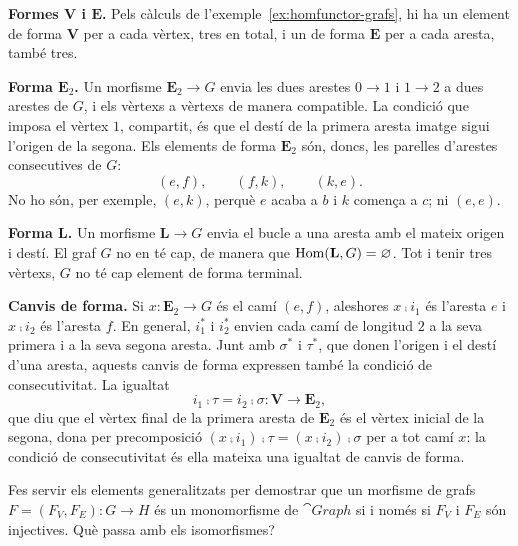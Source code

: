 \begin{solucio}
\textbf{Formes $\mathbf V$ i $\mathbf E$.} Pels càlculs de l'exemple~\ref{ex:homfunctor-grafs}, hi ha un element de forma $\mathbf V$ per a cada vèrtex, tres en total, i un de forma $\mathbf E$ per a cada aresta, també tres.

\textbf{Forma $\mathbf E_2$.} Un morfisme $\mathbf E_2\to G$ envia les dues arestes $0\to1$ i $1\to2$ a dues arestes de $G$, i els vèrtexs a vèrtexs de manera compatible. La condició que imposa el vèrtex $1$, compartit, és que el destí de la primera aresta imatge sigui l'origen de la segona. Els elements de forma $\mathbf E_2$ són, doncs, les parelles d'arestes consecutives de $G$:
\[
(e,f),\qquad(f,k),\qquad(k,e).
\]
No ho són, per exemple, $(e,k)$, perquè $e$ acaba a $b$ i $k$ comença a $c$; ni $(e,e)$.

\textbf{Forma $\mathbf L$.} Un morfisme $\mathbf L\to G$ envia el bucle a una aresta amb el mateix origen i destí. El graf $G$ no en té cap, de manera que $\operatorname{Hom}(\mathbf L,G)=\varnothing$. Tot i tenir tres vèrtexs, $G$ no té cap element de forma terminal.

\textbf{Canvis de forma.} Si $x\colon\mathbf E_2\to G$ és el camí $(e,f)$, aleshores $x\comp i_1$ és l'aresta $e$ i $x\comp i_2$ és l'aresta $f$. En general, $i_1^*$ i $i_2^*$ envien cada camí de longitud $2$ a la seva primera i a la seva segona aresta. Junt amb $\sigma^*$ i $\tau^*$, que donen l'origen i el destí d'una aresta, aquests canvis de forma expressen també la condició de consecutivitat. La igualtat
\[
i_1\comp\tau=i_2\comp\sigma\colon\mathbf V\to\mathbf E_2,
\]
que diu que el vèrtex final de la primera aresta de $\mathbf E_2$ és el vèrtex inicial de la segona, dona per precomposició $(x\comp i_1)\comp\tau=(x\comp i_2)\comp\sigma$ per a tot camí $x$: la condició de consecutivitat és ella mateixa una igualtat de canvis de forma.
\end{solucio}

\begin{exercici}\label{pr-mono-graph}
Fes servir els elements generalitzats per demostrar que un morfisme de grafs $F=(F_V,F_E)\colon G\to H$ és un monomorfisme de $\cat{Graph}$ si i només si $F_V$ i $F_E$ són injectives. Què passa amb els isomorfismes?
\end{exercici}

